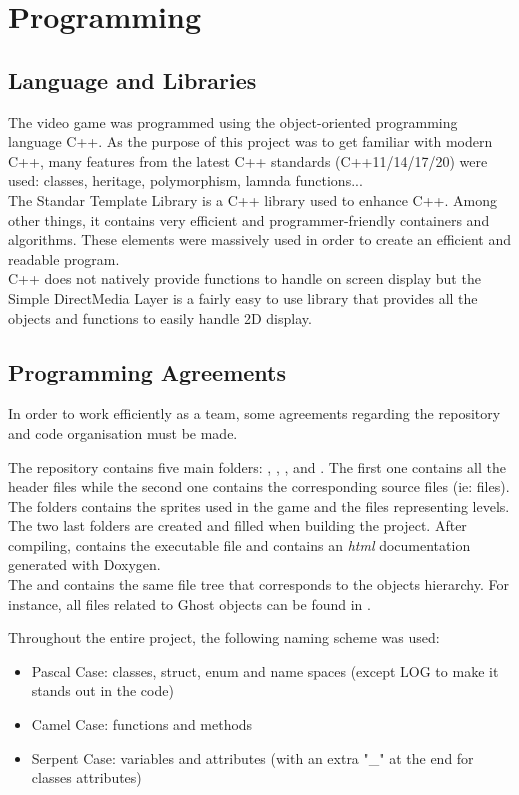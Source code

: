 \section{Programming}

\subsection{Language and Libraries}
The video game was programmed using the object-oriented programming language C++. As the purpose of this project was to get familiar with modern C++, many features from the latest C++ standards (C++11/14/17/20) were used: classes, heritage, polymorphism, lamnda functions...\\
The Standar Template Library is a C++ library used to enhance C++. Among other things, it contains very efficient and programmer-friendly containers and algorithms. These elements were massively used in order to create an efficient and readable program.\\
C++ does not natively provide functions to handle on screen display but the Simple DirectMedia Layer is a fairly easy to use library that provides all the objects and functions to easily handle 2D display.\\

\subsection{Programming Agreements}
In order to work efficiently as a team, some agreements regarding the repository and code organisation must be made.

The repository contains five main folders: , , ,  and . The first one contains all the header files while the second one contains the corresponding source files (ie:  files). The  folders contains the sprites used in the game and the files representing levels. The two last folders are created and filled when building the project. After compiling,  contains the executable file and  contains an \textit{html} documentation generated with Doxygen.\cite{doxygen}\\
The  and  contains the same file tree that corresponds to the objects hierarchy. For instance, all files related to \textsf{Ghost} objects can be found in .

Throughout the entire project, the following naming scheme was used:
\begin{itemize}
    \item Pascal Case: classes, struct, enum and name spaces (except \textsf{LOG} to make it stands out in the code)
    \item Camel Case: functions and methods
    \item Serpent Case: variables and attributes (with an extra "\_" at the end for classes attributes)
\end{itemize}

